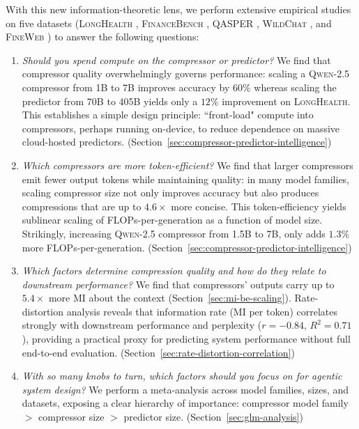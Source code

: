 \documentclass{article} %
\begin{document}
With this new information-theoretic lens, we perform extensive empirical studies on five datasets (\textsc{LongHealth} \citep{adams2024longhealth}, \textsc{FinanceBench} \citep{islam2023financebench}, \textsc{QASPER} \citep{qasper}, \textsc{WildChat} \citep{zhao2024wildchat}, and \textsc{FineWeb} \citep{penedo2024the}) to answer the following questions:

\begin{enumerate}[leftmargin=20pt]
    \item \emph{Should you spend compute on the compressor or predictor?} We find that compressor quality overwhelmingly governs performance: scaling a \textsc{Qwen-2.5} compressor from 1B to 7B improves accuracy by $60\%$ whereas scaling the predictor from 70B to 405B yields only a $12\%$ improvement on \textsc{LongHealth}. This establishes a simple design principle: ``front-load" compute into compressors, perhaps running on-device, to reduce dependence on massive cloud-hosted predictors. (Section~\ref{sec:compressor-predictor-intelligence})
    \item \emph{Which compressors are more token-efficient?} We find that larger compressors emit fewer output tokens while maintaining quality: in many model families, scaling compressor size not only improves accuracy but also produces compressions that are up to $4.6\times$ more concise. This token-efficiency yields sublinear scaling of FLOPs-per-generation as a function of model size.
    Strikingly, increasing \textsc{Qwen-2.5} compressor from 1.5B to 7B, only adds $1.3\%$ more FLOPs-per-generation. (Section~\ref{sec:compressor-predictor-intelligence})
    \item \emph{Which factors determine compression quality and how do they relate to downstream performance?} We find that compressors' outputs carry up to $5.4\times$ more MI about the context (Section~\ref{sec:mi-be-scaling}). Rate-distortion analysis reveals that information rate (MI per token) correlates strongly with downstream performance and perplexity ($r=-0.84$, $R^2 = 0.71$), providing a practical proxy for predicting system performance without full end-to-end evaluation. (Section~\ref{sec:rate-distortion-correlation})
    \item \emph{With so many knobs to turn, which factors should you focus on for agentic system design?} We perform a meta-analysis across model families, sizes, and datasets, exposing a clear hierarchy of importance: compressor model family $>$ compressor size $>$ predictor size. (Section~\ref{sec:glm-analysis})
\end{enumerate}
\end{document}
